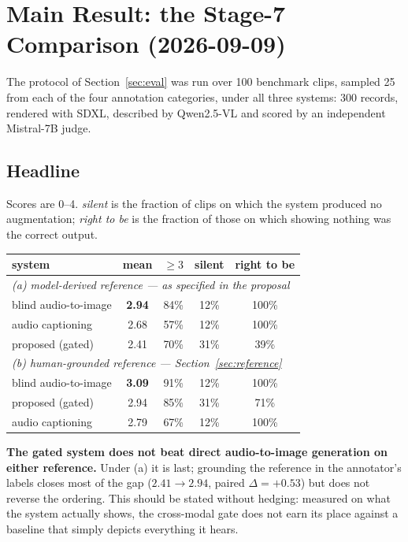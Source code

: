 \documentclass[11pt,a4paper]{article}
\begin{document}
\section{Main Result: the Stage-7 Comparison (2026-09-09)}\label{sec:mainresult}
The protocol of Section~\ref{sec:eval} was run over 100 benchmark clips, sampled 25 from each of the
four annotation categories, under all three systems: 300 records, rendered with SDXL, described by
Qwen2.5-VL and scored by an independent Mistral-7B judge.

\subsection{Headline}
Scores are 0--4. \emph{silent} is the fraction of clips on which the system produced no augmentation;
\emph{right to be} is the fraction of those on which showing nothing was the correct output.

\begin{center}\begin{tabular}{lcccc}
\toprule
system & mean & $\geq 3$ & silent & right to be \\
\midrule
\multicolumn{5}{l}{\emph{(a) model-derived reference --- as specified in the proposal}}\\
blind audio-to-image & \textbf{2.94} & 84\% & 12\% & 100\% \\
audio captioning     & 2.68 & 57\% & 12\% & 100\% \\
proposed (gated)     & 2.41 & 70\% & 31\% & 39\% \\
\midrule
\multicolumn{5}{l}{\emph{(b) human-grounded reference --- Section~\ref{sec:reference}}}\\
blind audio-to-image & \textbf{3.09} & 91\% & 12\% & 100\% \\
proposed (gated)     & 2.94 & 85\% & 31\% & 71\% \\
audio captioning     & 2.79 & 67\% & 12\% & 100\% \\
\bottomrule
\end{tabular}\end{center}

\textbf{The gated system does not beat direct audio-to-image generation on either reference.} Under
(a) it is last; grounding the reference in the annotator's labels closes most of the gap
($2.41 \rightarrow 2.94$, paired $\Delta = +0.53$) but does not reverse the ordering. This should be
stated without hedging: measured on what the system actually shows, the cross-modal gate does not
earn its place against a baseline that simply depicts everything it hears.
\end{document}
